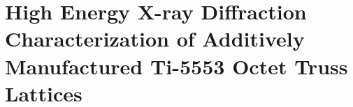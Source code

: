 \chapter{High Energy X-ray Diffraction Characterization of Additively Manufactured Ti-5553 Octet Truss Lattices}




